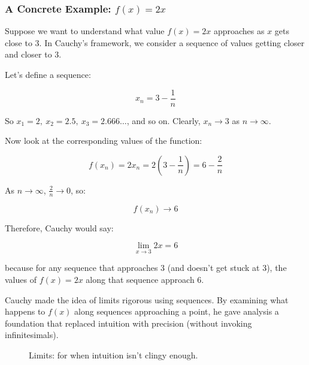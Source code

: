 \bigskip

\subsubsection{A Concrete Example: \( f(x) = 2x \)}

Suppose we want to understand what value \( f(x) = 2x \) approaches as \( x \) gets close to 3. In Cauchy’s framework, we consider a sequence of values getting closer and closer to 3.

Let’s define a sequence:

\[
x_n = 3 - \frac{1}{n}
\]

So \( x_1 = 2,\ x_2 = 2.5,\ x_3 = 2.666\dots \), and so on. Clearly, \( x_n \to 3 \) as \( n \to \infty \).

Now look at the corresponding values of the function:

\[
f(x_n) = 2x_n = 2 \left( 3 - \frac{1}{n} \right) = 6 - \frac{2}{n}
\]

As \( n \to \infty \), \( \frac{2}{n} \to 0 \), so:

\[
f(x_n) \to 6
\]

Therefore, Cauchy would say:

\[
\lim_{x \to 3} 2x = 6
\]

because for any sequence that approaches 3 (and doesn’t get stuck at 3), the values of \( f(x) = 2x \) along that sequence approach 6.

\bigskip

Cauchy made the idea of limits rigorous using sequences. By examining what happens to \( f(x) \) along sequences approaching a point, he gave analysis a foundation that replaced intuition with precision (without invoking infinitesimals).

\begin{figure}[H]
\centering
{}
\caption{Limits: for when intuition isn't clingy enough.}
\end{figure}






